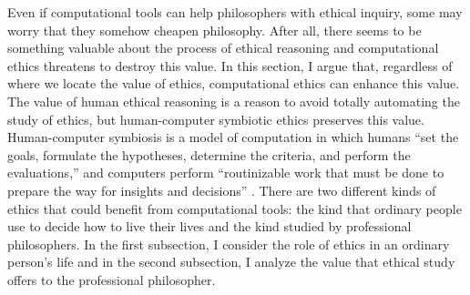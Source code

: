 %
\begin{isabellebody}%
%
%
\isadelimtheory
%
\endisadelimtheory
%
\isatagtheory
%
\endisatagtheory
{\isafoldtheory}%
%
\isadelimtheory
%
\endisadelimtheory
%
\isadelimdocument
%
\endisadelimdocument
%
\isatagdocument
%
\isamarkuptrue%
%
\endisatagdocument
{\isafolddocument}%
%
\isadelimdocument
%
\endisadelimdocument
%
\begin{isamarkuptext}%
Even if computational tools can help philosophers with ethical inquiry, some may worry that they
somehow cheapen philosophy. After all, there seems to be something valuable about the process of ethical
reasoning and computational ethics threatens to destroy this value. In this section, I argue that, 
regardless of where we locate the value of ethics, computational ethics can enhance this value. The
value of human ethical reasoning is a reason to avoid totally automating the study of ethics, but 
human-computer symbiotic ethics preserves this value. Human-computer symbiosis is a model of computation
in which humans ``set the goals, formulate the hypotheses, determine the criteria, and perform the evaluations,”
and computers perform ``routinizable work that must be done to prepare the way for insights and decisions” \citep{licklider}.
There are two different kinds of ethics that
could benefit from computational tools: the kind that ordinary people use to decide how to live their 
lives and the kind studied by professional philosophers. In the first subsection, I consider the role of ethics 
in an ordinary person’s life and in the second subsection, I analyze the value that ethical study offers to 
the professional philosopher. 


\end{isamarkuptext}
\end{isabellebody}
